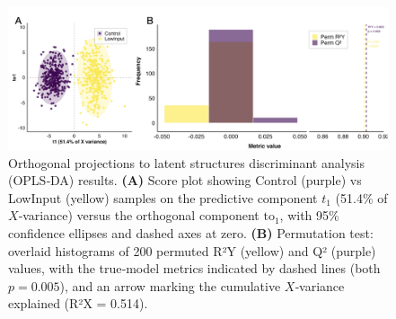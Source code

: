 \documentclass[10pt,letterpaper]{article}
\begin{document}
\begin{figure}[htbp]
  \centering
  \includegraphics[width=\textwidth]{fig/main/Fig2.png}
  \caption{Orthogonal projections to latent structures discriminant analysis (OPLS‐DA) results.  
    \textbf{(A)} Score plot showing Control (purple) vs LowInput (yellow) samples on the predictive component $t_1$ (51.4\% of $X$‐variance) versus the orthogonal component $\mathrm{to}_1$, with 95\% confidence ellipses and dashed axes at zero.  
    \textbf{(B)} Permutation test: overlaid histograms of 200 permuted R²Y (yellow) and Q² (purple) values, with the true‐model metrics indicated by dashed lines (both $p=0.005$), and an arrow marking the cumulative $X$‐variance explained (R²X = 0.514).}
  \label{fig:Fig2:OPLS}
\end{figure}
\end{document}

